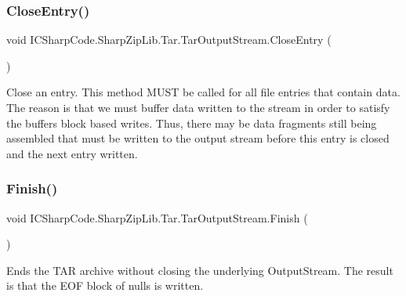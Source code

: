 \subsubsection{\texorpdfstring{Close\+Entry()}{CloseEntry()}}
{\footnotesize\ttfamily void I\+C\+Sharp\+Code.\+Sharp\+Zip\+Lib.\+Tar.\+Tar\+Output\+Stream.\+Close\+Entry (\begin{DoxyParamCaption}{ }\end{DoxyParamCaption})\hspace{0.3cm}{\ttfamily [inline]}}



Close an entry. This method M\+U\+ST be called for all file entries that contain data. The reason is that we must buffer data written to the stream in order to satisfy the buffer\textquotesingle{}s block based writes. Thus, there may be data fragments still being assembled that must be written to the output stream before this entry is closed and the next entry written. 

\mbox{\label{class_i_c_sharp_code_1_1_sharp_zip_lib_1_1_tar_1_1_tar_output_stream_a35766aed4ddf363bbaca72d33b0e071d}} 
\subsubsection{\texorpdfstring{Finish()}{Finish()}}
{\footnotesize\ttfamily void I\+C\+Sharp\+Code.\+Sharp\+Zip\+Lib.\+Tar.\+Tar\+Output\+Stream.\+Finish (\begin{DoxyParamCaption}{ }\end{DoxyParamCaption})\hspace{0.3cm}{\ttfamily [inline]}}



Ends the T\+AR archive without closing the underlying Output\+Stream. The result is that the E\+OF block of nulls is written. 

\mbox{\label{class_i_c_sharp_code_1_1_sharp_zip_lib_1_1_tar_1_1_tar_output_stream_a477e87e93e590aecbf41527d8e1e8222}} 
